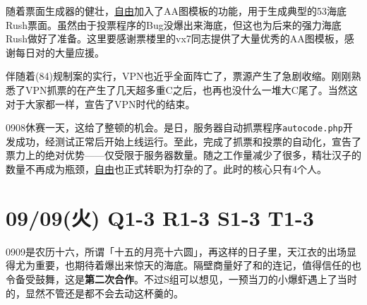 随着票面生成器的健壮，\uline{自由}加入了AA图模板的功能，用于生成典型的53海底Rush票面。虽然由于投票程序的Bug没爆出来海底，但这也为后来的强力海底Rush做好了准备。这里要感谢票楼里的vx7同志提供了大量优秀的AA图模板，感谢每日对的大量应援。

伴随着(84)规制案的实行，VPN也近乎全面阵亡了，票源产生了急剧收缩。刚刚熟悉了VPN抓票的在产生了几天超多重C之后，也再也没什么一堆大C尾了。当然这对于大家都一样，宣告了VPN时代的结束。

0908休赛一天，这给了整顿的机会。是日，服务器自动抓票程序\verb=autocode.php=开发成功，经测试正常后开始上线运行。至此，完成了抓票和投票的自动化，宣告了票力上的绝对优势——仅受限于服务器数量。随之工作量减少了很多，精壮汉子的数量不再成为瓶颈，\uline{自由}也正式转职为打杂的了。此时的核心只有4个人。

\section{09/09(火) Q1-3 R1-3 S1-3 T1-3}


0909是农历十六，所谓「十五的月亮十六圆」，再这样的日子里，天江衣的出场显得尤为重要，也期待着爆出来惊天的海底。隔壁商量好了和的连记，值得信任的也令备受鼓舞，这是\textbf{第二次合作}。不过S组可以想见，一预当刀的小爆虾遇上了当时的，显然不管还是都不会去动这杯羹的。

